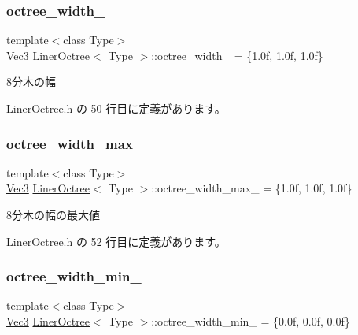 \subsubsection{\texorpdfstring{octree\+\_\+width\+\_\+}{octree\_width\_}}
{\footnotesize\ttfamily template$<$class Type$>$ \\
\mbox{\hyperlink{_vector3_d_8h_ab16f59e4393f29a01ec8b9bbbabbe65d}{Vec3}} \mbox{\hyperlink{class_liner_octree}{Liner\+Octree}}$<$ Type $>$\+::octree\+\_\+width\+\_\+ = \{1.\+0f, 1.\+0f, 1.\+0f\}\hspace{0.3cm}{\ttfamily [private]}}



8分木の幅 



 Liner\+Octree.\+h の 50 行目に定義があります。

\mbox{\label{class_liner_octree_abf54d24034d8ae53d7f7d17e6dfe02ff}} 
\subsubsection{\texorpdfstring{octree\+\_\+width\+\_\+max\+\_\+}{octree\_width\_max\_}}
{\footnotesize\ttfamily template$<$class Type$>$ \\
\mbox{\hyperlink{_vector3_d_8h_ab16f59e4393f29a01ec8b9bbbabbe65d}{Vec3}} \mbox{\hyperlink{class_liner_octree}{Liner\+Octree}}$<$ Type $>$\+::octree\+\_\+width\+\_\+max\+\_\+ = \{1.\+0f, 1.\+0f, 1.\+0f\}\hspace{0.3cm}{\ttfamily [private]}}



8分木の幅の最大値 



 Liner\+Octree.\+h の 52 行目に定義があります。

\mbox{\label{class_liner_octree_a391dbd4c22c6b16bfe49884d8b156738}} 
\subsubsection{\texorpdfstring{octree\+\_\+width\+\_\+min\+\_\+}{octree\_width\_min\_}}
{\footnotesize\ttfamily template$<$class Type$>$ \\
\mbox{\hyperlink{_vector3_d_8h_ab16f59e4393f29a01ec8b9bbbabbe65d}{Vec3}} \mbox{\hyperlink{class_liner_octree}{Liner\+Octree}}$<$ Type $>$\+::octree\+\_\+width\+\_\+min\+\_\+ = \{0.\+0f, 0.\+0f, 0.\+0f\}\hspace{0.3cm}{\ttfamily [private]}}



